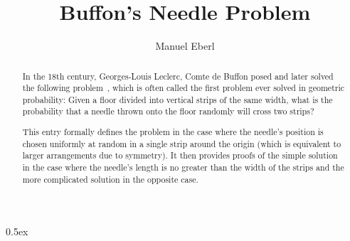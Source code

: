 \documentclass[11pt,a4paper]{article}
\begin{document}
\title{Buffon's {N}eedle {P}roblem}
\author{Manuel Eberl}
\maketitle

\begin{abstract}
In the 18th century, Georges-Louis Leclerc, Comte de Buffon posed and later solved the following problem~\cite{ramaley,mathworld}, which is often called the first problem ever solved in geometric probability: Given a floor divided into vertical strips of the same width, what is the probability that a needle thrown onto the floor randomly will cross two strips?

This entry formally defines the problem in the case where the needle's position is chosen uniformly at random in a single strip around the origin (which is equivalent to larger arrangements due to symmetry). It then provides proofs of the simple solution in the case where the needle's length is no greater than the width of the strips and the more complicated solution in the opposite case.
\end{abstract}

\tableofcontents
\newpage
\parindent 0pt\parskip 0.5ex





\end{document}
